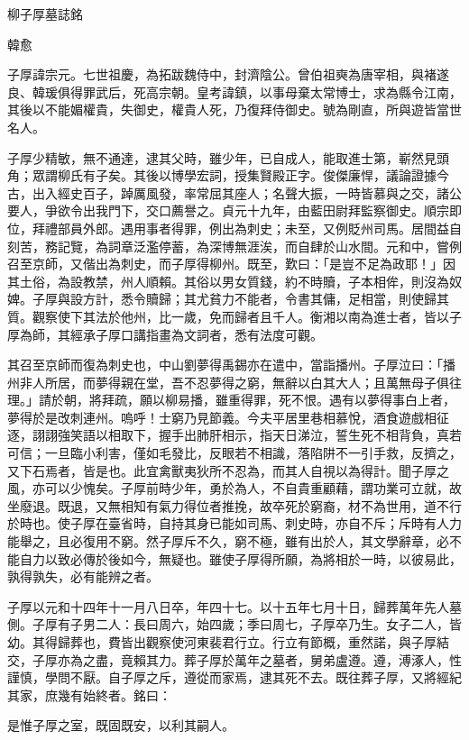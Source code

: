 柳子厚墓誌銘

韓愈

子厚諱宗元。七世祖慶，為拓跋魏侍中，封濟陰公。曾伯祖奭為唐宰相，與褚遂良、韓瑗俱得罪武后，死高宗朝。皇考諱鎮，以事母棄太常博士，求為縣令江南，其後以不能媚權貴，失御史，權貴人死，乃復拜侍御史。號為剛直，所與遊皆當世名人。

子厚少精敏，無不通達，逮其父時，雖少年，已自成人，能取進士第，嶄然見頭角；眾謂柳氏有子矣。其後以博學宏詞，授集賢殿正字。俊傑廉悍，議論證據今古，出入經史百子，踔厲風發，率常屈其座人；名聲大振，一時皆慕與之交，諸公要人，爭欲令出我門下，交口薦譽之。貞元十九年，由藍田尉拜監察御史。順宗即位，拜禮部員外郎。遇用事者得罪，例出為刺史；未至，又例貶州司馬。居間益自刻苦，務記覽，為詞章泛濫停蓄，為深博無涯涘，而自肆於山水間。元和中，嘗例召至京師，又偕出為刺史，而子厚得柳州。既至，歎曰：「是豈不足為政耶！」因其土俗，為設教禁，州人順賴。其俗以男女質錢，約不時贖，子本相侔，則沒為奴婢。子厚與設方計，悉令贖歸；其尤貧力不能者，令書其傭，足相當，則使歸其質。觀察使下其法於他州，比一歲，免而歸者且千人。衡湘以南為進士者，皆以子厚為師，其經承子厚口講指畫為文詞者，悉有法度可觀。

其召至京師而復為刺史也，中山劉夢得禹錫亦在遣中，當詣播州。子厚泣曰：「播州非人所居，而夢得親在堂，吾不忍夢得之窮，無辭以白其大人；且萬無母子俱往理。」請於朝，將拜疏，願以柳易播，雖重得罪，死不恨。遇有以夢得事白上者，夢得於是改刺連州。嗚呼！士窮乃見節義。今夫平居里巷相慕悅，酒食遊戲相征逐，詡詡強笑語以相取下，握手出肺肝相示，指天日涕泣，誓生死不相背負，真若可信；一旦臨小利害，僅如毛發比，反眼若不相識，落陷阱不一引手救，反擠之，又下石焉者，皆是也。此宜禽獸夷狄所不忍為，而其人自視以為得計。聞子厚之風，亦可以少愧矣。子厚前時少年，勇於為人，不自貴重顧藉，謂功業可立就，故坐廢退。既退，又無相知有氣力得位者推挽，故卒死於窮裔，材不為世用，道不行於時也。使子厚在臺省時，自持其身已能如司馬、刺史時，亦自不斥；斥時有人力能舉之，且必復用不窮。然子厚斥不久，窮不極，雖有出於人，其文學辭章，必不能自力以致必傳於後如今，無疑也。雖使子厚得所願，為將相於一時，以彼易此，孰得孰失，必有能辨之者。

子厚以元和十四年十一月八日卒，年四十七。以十五年七月十日，歸葬萬年先人墓側。子厚有子男二人：長曰周六，始四歲；季曰周七，子厚卒乃生。女子二人，皆幼。其得歸葬也，費皆出觀察使河東裴君行立。行立有節概，重然諾，與子厚結交，子厚亦為之盡，竟賴其力。葬子厚於萬年之墓者，舅弟盧遵。遵，溥涿人，性謹慎，學問不厭。自子厚之斥，遵從而家焉，逮其死不去。既往葬子厚，又將經紀其家，庶幾有始終者。銘曰：

是惟子厚之室，既固既安，以利其嗣人。